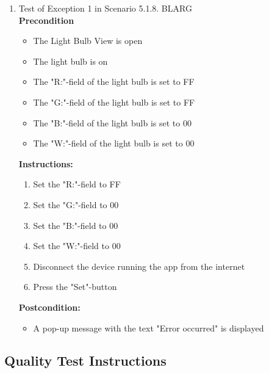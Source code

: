 \documentclass[a4paper]{article}
\newlength{\testlabellength}
\newenvironment{testlist}{\begin{enumerate}[label=\bfseries Instruction \thesubsection.\arabic* , labelindent=0pt, labelwidth=\testlabellength , leftmargin=2cm]}{\end{enumerate}}
\newenvironment{precondition}{
{\color{white}BLARG}\\ 
\textbf{Precondition}
\begin{itemize}[labelindent=0cm, labelwidth=2cm , leftmargin=1cm]
}
{\end{itemize}}
\newenvironment{instruction}{
\textbf{Instructions:}
\begin{enumerate}[label=\bfseries  \arabic*., labelindent=0cm, labelwidth=2cm , leftmargin=1cm]
}
{\end{enumerate}}
\newenvironment{postcondition}{
\textbf{Postcondition:}
\begin{itemize}[labelindent=0cm, labelwidth=2cm , leftmargin=1cm]
}
{\end{itemize}}
\begin{document}
\begin{appendices}
\begin{testlist}
	\item  Test of Exception 1 in Scenario 5.1.8.
		\begin{precondition}
			\item The Light Bulb View is open
			\item The light bulb is on
			\item The "R:"-field of the light bulb is set to FF
			\item The "G:"-field of the light bulb is set to FF
			\item The "B:"-field of the light bulb is set to 00
			\item The "W:"-field of the light bulb is set to 00
		\end{precondition}
		\begin{instruction}
			\item Set the "R:"-field to FF
			\item Set the "G:"-field to 00
			\item Set the "B:"-field to 00
			\item Set the "W:"-field to 00
			\item Disconnect the device running the app from the internet
			\item Press the "Set"-button
		\end{instruction}
		\begin{postcondition}
			\item A pop-up message with the text "Error occurred" is displayed
		\end{postcondition}
		
\end{testlist}
\newpage
\subsection{Quality Test Instructions}

\begin{testlist}


\end{testlist}
\end{appendices}
\end{document}

